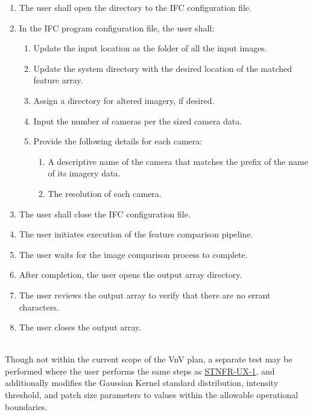 \documentclass[12pt, titlepage]{article}
\begin{document}
\begin{enumerate}
  \item The user shall open the directory to the IFC configuration file.
  \item In the IFC program configuration file, the user shall:
  \begin{enumerate}
      \item Update the input location as the folder of all the input images.
      \item Update the system directory with the desired location of the matched feature array.
      \item Assign a directory for altered imagery, if desired.
      \item Input the number of cameras per the sized camera data.
      \item Provide the following details for each camera:
      \begin{enumerate}
          \item A descriptive name of the camera that matches the prefix of the name of its imagery data.
          \item The resolution of each camera.
      \end{enumerate}
  \end{enumerate}
  \item The user shall close the IFC configuration file.
  \item The user initiates execution of the feature comparison pipeline.
  \item The user waits for the image comparison process to complete.
  \item After completion, the user opens the output array directory.
  \item The user reviews the output array to verify that there are no errant characters.
  \item The user closes the output array.
\end{enumerate}
\mbox{} \\
Though not within the current scope of the VnV plan, a separate test may be performed where the 
user performs the same steps as \hyperlink{STNFR-UX-1}{STNFR-UX-1}, 
and additionally modifies the Gaussian Kernel standard distribution, intensity threshold, and patch size 
parameters to values within the allowable operational boundaries. 
\end{document}

